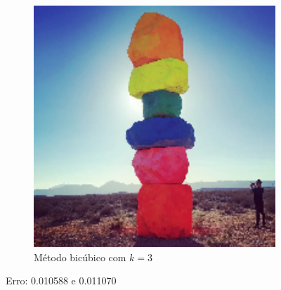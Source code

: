 \documentclass[leqno]{article}
\begin{document}
\begin{figure}[H]
\begin{subfigure}{.33\textwidth}
        \includegraphics[width=.7\linewidth]{../images/pedrascoloridas_bic.png}
        \caption{Método bicúbico com $k = 3$}
        \label{fig:sub1}
      \end{subfigure}%
    \caption{Erro: 0.010588 e 0.011070}
    \label{fig:test}
\end{figure}
\end{document}
